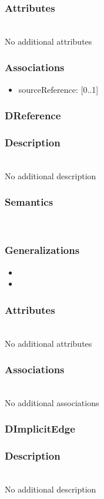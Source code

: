 \documentclass{article}
\begin{document}
\subsubsection*{Attributes} ~\\ No additional attributes
\subsubsection*{Associations}
\begin{itemize}
\item sourceReference:  [0..1] 
\end{itemize}
\subsubsection{DReference}\label{DReference} 
\subsubsection*{Description} ~\\ No additional description
\subsubsection*{Semantics} ~\\

\subsubsection*{Generalizations}
\begin{itemize}
\item {}
\item {}
\end{itemize}
\subsubsection*{Attributes} ~\\ No additional attributes
\subsubsection*{Associations} ~\\ No additional associations
\subsubsection{DImplicitEdge}\label{DImplicitEdge} 
\subsubsection*{Description} ~\\ No additional description
\end{document}
